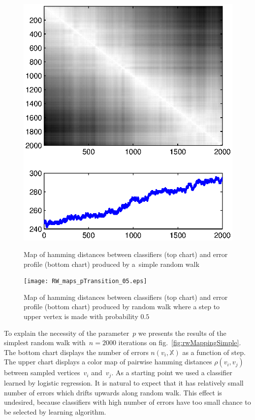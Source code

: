 \documentclass{article} %
\def\XX{\mathbb{X}}
\begin{document}
\begin{figure}[t]
\centering
\begin{multicols}{2}
    \hfill
    \includegraphics[width=0.9\linewidth]{RW_maps_pTransition_1.eps}
    \hfill
    \caption{Map of hamming distances between classifiers (top chart)
        and error profile (bottom chart) produced by a~simple random walk}
    \label{fig:rwMappingSimple}
    \hfill
    \texttt{[image: RW\_maps\_pTransition\_05.eps]}
    \hfill
    \caption{Map of hamming distances between classifiers (top chart)
        and error profile (bottom chart) produced by random walk where a step to
        upper vertex is made with probability $0.5$}
    \label{fig:rwMappingPTransition}
\end{multicols}
\end{figure}

To explain the necessity of the parameter~$p$
we presents the results of the simplest random walk with~$n = 2000$ iterations
on fig.~\ref{fig:rwMappingSimple}.
The bottom chart displays the number of errors $n(v_i, \XX)$ as a function of step.
The upper chart displays a color map of pairwise hamming distances $\rho(v_i, v_j)$
between sampled vertices~$v_i$ and~$v_j$.
As a starting point we used a classifier learned by logistic regression.
It is natural to expect that it has relatively small number of errors which drifts upwards along random walk.
This effect is undesired, because classifiers with high number of errors have too small chance to be selected by learning algorithm.
\end{document}
